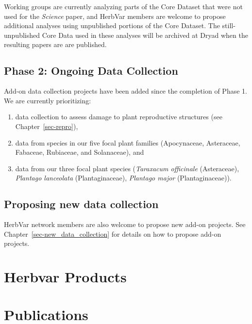 \documentclass[
  letterpaper,
  oneside,
  open=any]{scrbook}
\providecommand{\tightlist}{%
  \setlength{\itemsep}{0pt}\setlength{\parskip}{0pt}}\usepackage{longtable,booktabs,array}
\begin{document}
Working groups are currently analyzing parts of the Core Dataset that
were not used for the \emph{Science} paper, and HerbVar members are
welcome to propose additional analyses using unpublished portions of the
Core Dataset. The still-unpublished Core Data used in these analyses
will be archived at Dryad when the resulting papers are are published.

\section{Phase 2: Ongoing Data
Collection}\label{phase-2-ongoing-data-collection}

Add-on data collection projects have been added since the completion of
Phase 1. We are currently prioritizing:

\begin{enumerate}
\def\labelenumi{(\roman{enumi})}
\tightlist
\item
  data collection to assess damage to plant reproductive structures (see
  Chapter~\ref{sec-repro}),
\item
  data from species in our five focal plant families (Apocynaceae,
  Asteraceae, Fabaceae, Rubiaceae, and Solanaceae), and\\
\item
  data from our three focal plant species (\emph{Taraxacum officinale}
  (Asteraceae), \emph{Plantago lanceolata} (Plantaginaceae),
  \emph{Plantago major} (Plantaginaceae)).
\end{enumerate}

\section{Proposing new data
collection}\label{proposing-new-data-collection}

HerbVar network members are also welcome to propose new add-on projects.
See Chapter~\ref{sec-new_data_collection} for details on how to propose
add-on projects.

\chapter{Herbvar Products}\label{herbvar-products}

\chapter*{Publications}\label{publications}
\end{document}
